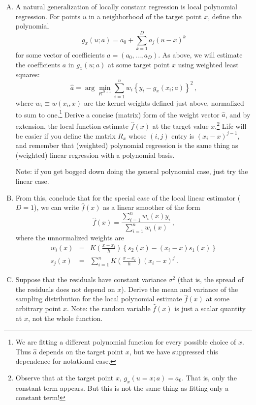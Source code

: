\documentclass[11pt]{article}
\begin{document}
\begin{enumerate}[(A)]

\item  A natural generalization of locally constant regression is local polynomial regression.  For points $u$ in a neighborhood of the target point $x$, define the polynomial
$$
g_{x}(u; a) = a_0 + \sum_{k=1}^D a_j(u-x)^k 
$$
for some vector of coefficients $a = (a_0, \ldots, a_D)$.  As above, we will estimate the coefficients $a$ in $g_{x}(u; a)$ at some target point $x$ using weighted least squares:
$$
\hat{a} = \arg \min_{R^{D+1}} \sum_{i=1}^n w_i \left\{ y_i - g_{x}(x_i; a)  \right\}^2 \, ,
$$
where $w_i \equiv w(x_i, x)$ are the kernel weights defined just above, normalized to sum to one.\footnote{We are fitting a different polynomial function for every possible choice of $x$.  Thus $\hat{a}$ depends on the target point $x$, but we have suppressed this dependence for notational ease.} Derive a concise (matrix) form of the weight vector $\hat{a}$, and by extension, the local function estimate $\hat{f}(x)$ at the target value $x$.\footnote{Observe that at the target point $x$, $g_x(u = x; a) = a_0$.  That is, only the constant term appears.  But this is not the same thing as fitting only a constant term!}   Life will be easier if you define the matrix $R_x$ whose $(i,j)$ entry is $(x_i-x)^{j-1}$, and remember that (weighted) polynomial regression is the same thing as (weighted) linear regression with a polynomial basis.

Note: if you get bogged down doing the general polynomial case, just try the linear case.

\item From this, conclude that for the special case of the local linear estimator ($D=1$), we can write $\hat{f}(x)$ as a linear smoother of the form
$$
\hat{f}(x) = \frac{\sum_{i=1}^n w_i(x) y_i }{\sum_{i=1}^n w_i(x)} \, ,
$$
where the unnormalized weights are
\begin{eqnarray*}
w_i(x) &=& K \left( \frac{x-x_i}{h} \right) \left\{  s_2(x) - (x_i-x) s_1(x) \right\}\\
s_j(x) &=& \sum_{i=1}^n K \left( \frac{x-x_i}{h} \right) (x_i-x)^j \, .
\end{eqnarray*}

\item Suppose that the residuals have constant variance $\sigma^2$ (that is, the spread of the residuals does not depend on $x$).  Derive the mean and variance of the sampling distribution for the local polynomial estimate $\hat{f}(x)$ at some arbitrary point $x$.  Note: the random variable $\hat{f}(x)$ is just a scalar quantity at $x$, not the whole function.


\end{enumerate}
\end{document}

